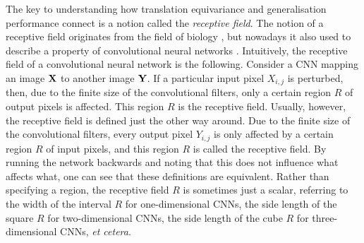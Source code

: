 \documentclass[12pt]{report}
\begin{document}
The key to understanding how translation equivariance and generalisation performance connect is a notion called the \emph{receptive field}.
The notion of a receptive field originates from the field of biology \parencite{Sherrington:1906:Observations_on_the_Scratch-Reflex_in}, but nowadays it also used to describe a property of convolutional neural networks \parencite{Luo:2016:Understanding_the_Effective_Receptive_Field}.
Intuitively, the receptive field of a convolutional neural network is the following.
Consider a CNN mapping an image $\mathbf{X}$ to another image $\mathbf{Y}$.
If a particular input pixel $X_{i,j}$ is perturbed, then, due to the finite size of the convolutional filters, only a certain region $R$ of output pixels is affected.
This region $R$ is the receptive field.
Usually, however, the receptive field is defined just the other way around.
Due to the finite size of the convolutional filters, every output pixel $Y_{i,j}$ is only affected by a certain region $R$ of input pixels, and this region $R$ is called the receptive field.
By running the network backwards and noting that this does not influence what affects what, one can see that these definitions are equivalent.
Rather than specifying a region, the receptive field $R$ is sometimes just a scalar, referring to the width of the interval $R$ for one-dimensional CNNs, the side length of the square $R$ for two-dimensional CNNs, the side length of the cube $R$ for three-dimensional CNNs, \textit{et cetera}.
\end{document}
